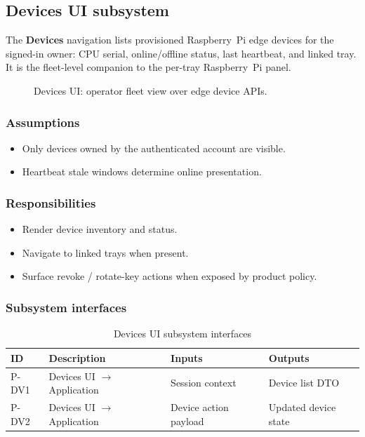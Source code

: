 \subsection{Devices UI subsystem}

The \textbf{Devices} navigation lists provisioned Raspberry~Pi edge devices for the signed-in owner: CPU serial, online/offline status, last heartbeat, and linked tray. It is the fleet-level companion to the per-tray Raspberry~Pi panel.

\begin{figure}[H]
\centering
{}
\caption{Devices UI: operator fleet view over edge device APIs.}
\label{fig:pres-devices}
\end{figure}

\subsubsection{Assumptions}
\begin{itemize}
  \item Only devices owned by the authenticated account are visible.
  \item Heartbeat stale windows determine online presentation.
\end{itemize}

\subsubsection{Responsibilities}
\begin{itemize}
  \item Render device inventory and status.
  \item Navigate to linked trays when present.
  \item Surface revoke / rotate-key actions when exposed by product policy.
\end{itemize}

\subsubsection{Subsystem interfaces}
\begin{table}[H]
\centering
\small
\begin{tabular}{|p{0.9cm}|p{3.4cm}|p{3.0cm}|p{3.5cm}|}
\hline
\textbf{ID} & \textbf{Description} & \textbf{Inputs} & \textbf{Outputs} \\
\hline
P-DV1 & Devices UI $\rightarrow$ Application & Session context & Device list DTO \\
\hline
P-DV2 & Devices UI $\rightarrow$ Application & Device action payload & Updated device state \\
\hline
\end{tabular}
\caption{Devices UI subsystem interfaces}
\end{table}

